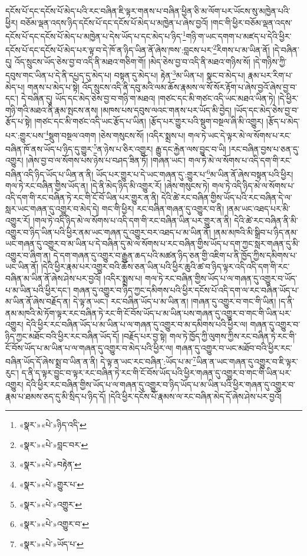 དངོས་པོ་དང་དངོས་པོ་མེད་པའི་རང་བཞིན་ཇི་ལྟར་གནས་པ་བཞིན་ཕྱིན་ཅི་མ་ལོག་པར་ཡོངས་སུ་མཁྱེན་པའི་ཕྱིར། བཅོམ་ལྡན་འདས་ཉིད་དངོས་པོ་དང་དངོས་པོ་མེད་པ་མཁྱེན་པ་ཞེས་བྱའོ། །གང་གི་ཕྱིར་བཅོམ་ལྡན་འདས་དངོས་པོ་དང་དངོས་པོ་མེད་པ་མཁྱེན་པ་དེས་ཡོད་པ་དང་མེད་པ་ཉིད་\footnote{«སྣར་»«པེ་»ཉིད་འདི་}གཉི་ག་ཡང་དགག་པ་མཛད་པ་དེའི་ཕྱིར་དངོས་པོ་དང་དངོས་པོ་མེད་པར་ལྟ་བ་དེ་ཁོ་ན་ཉིད་ཡིན་ནོ་ཞེས་ཁས་:བླངས་པར་\footnote{«སྣར་»«པེ་»བླང་བར་}རིགས་པ་མ་ཡིན་ནོ། །དེ་བཞིན་དུ། འོད་སྲུངས་ཡོད་ཅེས་བྱ་བ་འདི་ནི་མཐའ་གཅིག་གོ། །མེད་ཅེས་བྱ་བ་འདི་ནི་མཐའ་གཉིས་སོ། །དེ་གཉིས་ཀྱི་དབུས་གང་ཡིན་པ་དེ་ནི་དཔྱད་དུ་མེད་པ། བསྟན་དུ་མེད་པ། རྟེན་\footnote{«སྣར་»«པེ་»བརྟེན་}མ་ཡིན་པ། སྣང་བ་མེད་པ། རྣམ་པར་རིག་པ་མེད་པ། གནས་པ་མེད་པ་སྟེ། འོད་སྲུངས་འདི་ནི་དབུ་མའི་ལམ་ཆོས་རྣམས་ལ་སོ་སོར་རྟོག་པ་ཞེས་བྱའོ་ཞེས་བྱ་བ་དང་། དེ་བཞིན་དུ། ཡོད་དང་མེད་ཅེས་བྱ་བ་གཉི་ག་མཐའ། །གཙང་དང་མི་གཙང་འདི་ཡང་མཐའ་ཡིན་ཏེ། །དེ་ཕྱིར་གཉི་གའི་མཐའ་ནི་རྣམ་སྤངས་ནས། །མཁས་པས་དབུས་ལའང་གནས་པར་ཡོད་མི་བྱེད། །ཡོད་དང་མེད་ཅེས་བྱ་བ་རྩོད་པ་སྟེ། །གཙང་དང་མི་གཙང་འདི་ཡང་རྩོད་པ་ཡིན། །རྩོད་པར་གྱུར་པའི་སྡུག་བསྔལ་ཞི་མི་འགྱུར། །རྩོད་པ་མེད་པར་:གྱུར་པས་\footnote{«སྣར་»«པེ་»གྱུར་པ་}སྡུག་བསྔལ་འགག །ཅེས་གསུངས་སོ། །འདིར་སྨྲས་པ། གལ་ཏེ་ཡང་དེ་ལྟར་མེ་ལ་སོགས་པ་རང་བཞིན་ཁོ་ནས་ཡོད་པ་ཉིད་དུ་གྱུར་\footnote{«སྣར་»«པེ་»འགྱུར་}ན་ཉེས་པ་ཅིར་འགྱུར། རྒྱུ་དང་རྐྱེན་ལས་བྱུང་བ་ཡི། །རང་བཞིན་བྱས་པ་ཅན་དུ་འགྱུར། །ཞེས་བྱ་བ་ལ་སོགས་པས་ཉེས་པ་བཤད་ཟིན་ཏོ། །གཞན་ཡང་། གལ་ཏེ་མེ་ལ་སོགས་པ་འདི་དག་གི་རང་བཞིན་འདི་ཉིད་ཡོད་པ་ཡིན་ན་ནི། ཡོད་པར་གྱུར་པ་དེ་ཡང་གཞན་དུ་:གྱུར་པ་\footnote{«སྣར་»«པེ་»འགྱུར་བ་}མ་ཡིན་ནོ་ཞེས་བསྟན་པའི་ཕྱིར། གལ་ཏེ་རང་བཞིན་གྱིས་ཡོད་ན། །དེ་ནི་མེད་ཉིད་མི་འགྱུར་རོ། །ཞེས་གསུངས་ཏེ། གལ་ཏེ་འདི་ཉིད་མེ་ལ་སོགས་པ་འདི་དག་གི་རང་བཞིན་ཏེ་རང་གི་ངོ་བོ་ཡིན་པར་གྱུར་ན་ནི། དེའི་ཚེ་རང་བཞིན་གྱིས་ཡོད་པའི་རང་བཞིན་དེ་ལ་སླར་ཡང་གཞན་དུ་འགྱུར་བ་མེད་དེ། གང་གི་ཕྱིར། རང་བཞིན་གཞན་དུ་འགྱུར་བ་ནི། །ནམ་ཡང་འཐད་པར་མི་འགྱུར་རོ། །གལ་ཏེ་འདི་ཉིད་མེ་ལ་སོགས་པ་འདི་དག་གི་རང་བཞིན་ཡིན་པར་གྱུར་ན་ནི། དེའི་ཚེ་རང་བཞིན་ནི་མི་འགྱུར་བ་ཉིད་ཡིན་པའི་ཕྱིར་ནམ་ཡང་གཞན་དུ་འགྱུར་བར་འཐད་པ་མ་ཡིན་ནོ། །ནམ་མཁའི་མི་སྒྲིབ་པ་ཉིད་ནམ་ཡང་གཞན་དུ་འགྱུར་བ་མ་ཡིན་པ་དེ་བཞིན་དུ་མེ་ལ་སོགས་པ་རང་བཞིན་གྱིས་ཡོད་པ་དག་ཀྱང་སླར་གཞན་དུ་མི་འགྱུར་བ་ཞིག་ན། དེ་དག་གཞན་དུ་འགྱུར་བ་རྒྱུན་ཆད་པའི་མཚན་ཉིད་ཅན་གྱི་འཇིག་པ་ནི་ཁྱོད་ཀྱིས་དམིགས་པ་ཡང་ཡིན་ནོ། །དེའི་ཕྱིར་རྣམ་པར་འགྱུར་བའི་ཆོས་ཅན་ཡིན་པའི་ཕྱིར་ཆུའི་ཚ་བ་ཉིད་ལྟར་འདི་འདི་དག་གི་རང་བཞིན་མ་ཡིན་ནོ་ཞེས་ཤེས་པར་བྱའོ། །འདིར་སྨྲས་པ། གལ་ཏེ་རང་བཞིན་གྱིས་ཡོད་པ་ལ་གཞན་དུ་འགྱུར་བ་ཡོད་པ་མ་ཡིན་པའི་ཕྱིར་དང་། གཞན་དུ་འགྱུར་བ་ཉིད་ཀྱང་དམིགས་པའི་ཕྱིར་དངོས་པོ་འདི་དག་ལ་རང་བཞིན་ཡོད་པ་མ་ཡིན་ནོ་ཞེས་བརྗོད་ན། དེ་ལྟ་ན་ཡང་། རང་བཞིན་ཡོད་པ་མ་ཡིན་ན། །གཞན་དུ་འགྱུར་བ་གང་གི་ཡིན། །ད་ནི་ནམ་མཁའི་མེ་ཏོག་ལྟར་རང་བཞིན་ཏེ་རང་གི་ངོ་བོས་ཡོད་པ་མ་ཡིན་པས་གཞན་དུ་འགྱུར་བ་གང་གི་ཡིན་པར་འགྱུར། དེའི་ཕྱིར་རང་བཞིན་ཡོད་པ་མ་ཡིན་པ་ལ་གཞན་དུ་འགྱུར་བ་མ་དམིགས་པའི་ཕྱིར་ལ། གཞན་དུ་འགྱུར་བ་ཉིད་ཀྱང་མཐོང་བའི་ཕྱིར་རང་བཞིན་ཡོད་དོ། །བརྗོད་པར་བྱ་སྟེ། གལ་ཏེ་ཁྱོད་ཀྱི་ལུགས་ཀྱིས་རང་བཞིན་ཏེ་རང་གི་ངོ་བོས་ཡོད་པ་མ་ཡིན་པ་ལ་གཞན་དུ་འགྱུར་བ་མེད་པའི་ཕྱིར་ལ། གཞན་དུ་འགྱུར་བ་ཡང་མཐོབ་བའི་ཕྱིར་རང་བཞིན་ཡོད་དོ་ཞེས་སྨྲ་བ་ཡིན་ན་ནི། དེ་ལྟ་ན་ཡང་རང་བཞིན་:ཡོད་པ་མ་\footnote{«སྣར་»«པེ་»ཡོད་པ་}ཡིན་ན་ཡང་གཞན་དུ་འགྱུར་བ་ཇི་ལྟར་རུང་། ད་ནི་ད་ལྟར་བྱུང་བ་ལྟར་རང་བཞིན་ཏེ་རང་གི་ངོ་བོས་ཡོད་པའི་ཕྱིར་གཞན་དུ་འགྱུར་བ་གང་གི་ཡིན་པར་འགྱུར། དེའི་ཕྱིར་རང་བཞིན་གྱིས་ཡོད་པ་ལ་གཞན་དུ་འགྱུར་བ་ཉིད་ཡོད་པ་མ་ཡིན་པའི་ཕྱིར་གཞན་དུ་འགྱུར་བ་རྣམ་པ་ཐམས་ཅད་དུ་མི་སྲིད་པ་ཉིད་དོ། །དེའི་ཕྱིར་དངོས་པོ་རྣམས་ལ་རང་བཞིན་མེད་དོ་ཞེས་ཤེས་པར་བྱའོ། 